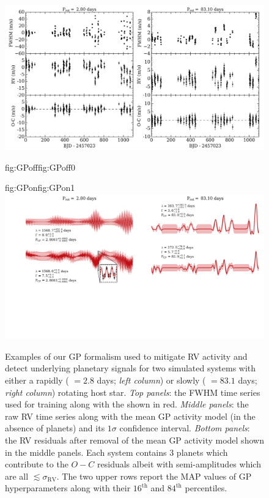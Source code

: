 \begin{figure}
  \centering
  \includegraphics[width=\hsize]{figures/GPexample_bkgd.png}%
  \hspace{-\hsize}%
  \begin{ocg}{fig:GPoff}{fig:GPoff}{0}%
  \end{ocg}%
  \begin{ocg}{fig:GPon}{fig:GPon}{1}%
    \includegraphics[width=\hsize]{figures/GPexample_GP.png}%
  \end{ocg}
  \hspace{-\hsize}%
  \caption[Examples of GP activity models in simulated SPIRou timeseries.]
      {\small Examples of our GP formalism used to mitigate RV activity and detect underlying planetary signals for two
    simulated systems with either a rapidly (\prot{} $=2.8$ days; \emph{left column}) or slowly (\prot{} $=83.1$ days;
    \emph{right column}) rotating host star. \emph{Top panels}: the FWHM time series used for training along with the
    shown in red. \emph{Middle panels}: the raw
    RV time series along with the mean GP activity model (in the absence of planets) and its $1\sigma$ confidence interval.
    \emph{Bottom panels}: the RV residuals after removal of the mean GP activity model shown in the middle panels.
    Each system contains 3 planets which contribute to the $O-C$ residuals albeit with semi-amplitudes which are all
    $\lesssim \sigma_{\text{RV}}$. The two upper rows report the MAP values of GP hyperparameters along with their
    $16^{\text{th}}$ and $84^{\text{th}}$ percentiles.}
  \label{BSfig:GPexample}
\end{figure}

